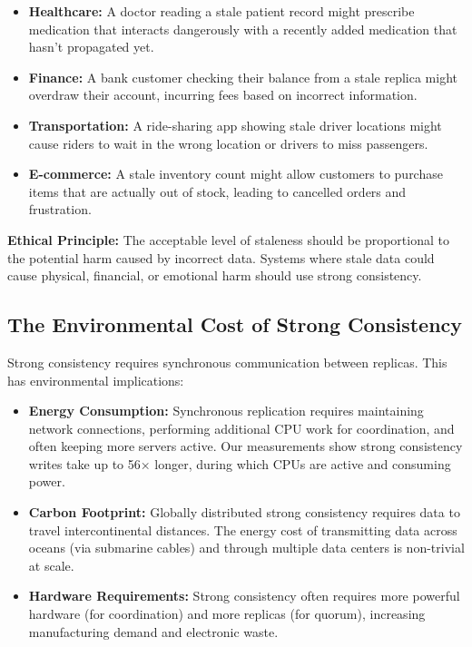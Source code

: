 \documentclass[10pt,a4paper]{article}
\begin{document}
\begin{itemize}
    \item \textbf{Healthcare:} A doctor reading a stale patient record might prescribe medication that interacts dangerously with a recently added medication that hasn't propagated yet.
    
    \item \textbf{Finance:} A bank customer checking their balance from a stale replica might overdraw their account, incurring fees based on incorrect information.
    
    \item \textbf{Transportation:} A ride-sharing app showing stale driver locations might cause riders to wait in the wrong location or drivers to miss passengers.
    
    \item \textbf{E-commerce:} A stale inventory count might allow customers to purchase items that are actually out of stock, leading to cancelled orders and frustration.
\end{itemize}

\textbf{Ethical Principle:} The acceptable level of staleness should be proportional to the potential harm caused by incorrect data. Systems where stale data could cause physical, financial, or emotional harm should use strong consistency.

\subsection{The Environmental Cost of Strong Consistency}

Strong consistency requires synchronous communication between replicas. This has environmental implications:

\begin{itemize}
    \item \textbf{Energy Consumption:} Synchronous replication requires maintaining network connections, performing additional CPU work for coordination, and often keeping more servers active. Our measurements show strong consistency writes take up to 56× longer, during which CPUs are active and consuming power.
    
    \item \textbf{Carbon Footprint:} Globally distributed strong consistency requires data to travel intercontinental distances. The energy cost of transmitting data across oceans (via submarine cables) and through multiple data centers is non-trivial at scale.
    
    \item \textbf{Hardware Requirements:} Strong consistency often requires more powerful hardware (for coordination) and more replicas (for quorum), increasing manufacturing demand and electronic waste.
\end{itemize}
\end{document}
